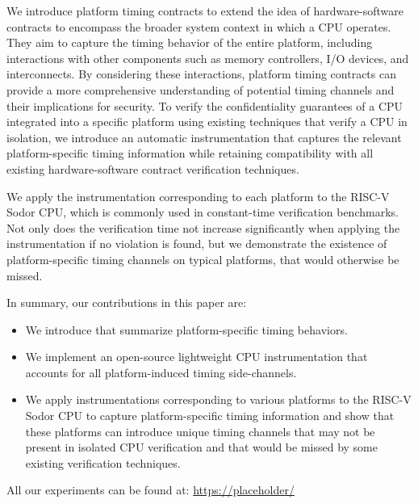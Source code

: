 We introduce platform timing contracts to extend the idea of hardware-software contracts to encompass the broader system context in which a CPU operates.
They aim to capture the timing behavior of the entire platform, including interactions with other components such as memory controllers, I/O devices, and interconnects.
By considering these interactions, platform timing contracts can provide a more comprehensive understanding of potential timing channels and their implications for security.
To verify the confidentiality guarantees of a CPU integrated into a specific platform using existing techniques that verify a CPU in isolation, we introduce an automatic instrumentation that captures the relevant platform-specific timing information while retaining compatibility with all existing hardware-software contract verification techniques.

We apply the instrumentation corresponding to each platform to the RISC-V Sodor CPU, which is commonly used in constant-time verification benchmarks.
Not only does the verification time not increase significantly when applying the instrumentation if no violation is found, but we demonstrate the existence of platform-specific timing channels on typical platforms, that would otherwise be missed.

In summary, our contributions in this paper are:
\begin{itemize}
    \item We introduce \pics that summarize platform-specific timing behaviors.
    \item We implement an open-source lightweight CPU instrumentation that accounts for all platform-induced timing side-channels.
    \item We apply instrumentations corresponding to various platforms to the RISC-V Sodor CPU to capture platform-specific timing information and show that these platforms can introduce unique timing channels that may not be present in isolated CPU verification and that would be missed by some existing verification techniques.
\end{itemize}

\vspace*{0.5em}
All our experiments can be found at: \url{https://placeholder/} 

